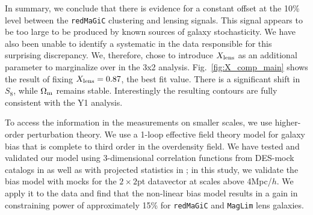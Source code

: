 \documentclass[aps, prd,twocolumn,superscriptaddress,nofootinbib,preprintnumbers]{revtex4-1}
\newcommand{\redmagic}{\texttt{redMaGiC} }
\newcommand{\maglim}{\texttt{MagLim} }
\newcommand{\IR}[1]{{\color{red}[\textbf{Note for IR}: #1]}}
\begin{document}


In summary, we conclude that there is evidence for a constant offset at the 10\% level between the \redmagic clustering and lensing signals.
This signal appears to be too large to be produced by known sources of galaxy stochasticity. We have also been unable to identify a systematic in the data responsible for this surprising discrepancy. We, therefore, chose to introduce $X_{\rm lens}$ as an additional parameter to marginalize over in the 3x2 analysis. Fig.~\ref{fig:X_comp_main} shows the result of fixing $X_{\rm lens}=0.87$, the best fit value. There is a significant shift in $S_8$, while $\Omega_{\rm m}$ remains stable. Interestingly the resulting contours are fully consistent with the Y1 analysis.  

To access the information in the measurements on smaller scales, we use higher-order perturbation theory. We use a 1-loop effective field theory model for galaxy bias that is complete to third order in the overdensity field. We have tested and validated our model using 3-dimensional correlation functions from DES-mock catalogs in \citet{p2020perturbation} as well as with projected statistics in \citet*{y3-simvalidation}; in this study, we validate the bias model with mocks for the $2\times2$pt datavector at scales above 4Mpc/$h$. We apply it to the data and find that the non-linear bias model results in a gain in constraining power of approximately 15\% for \redmagic and \maglim lens galaxies. 
\end{document}
